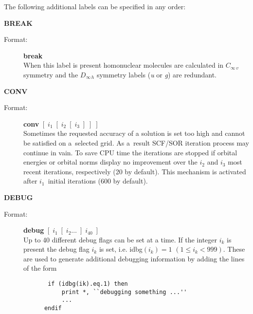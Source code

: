 \documentclass[12pt,a4paper]{article}
\newcommand{\ft}[1]{\texttt{#1}}
\begin{document}
The following additional labels can be specified in any order:
\begin{description}


\item \textbf{BREAK}
\begin{description}
\item[Format:] \textbf{break} \\ When this label is present homonuclear molecules are
  calculated in $C_{\infty\,v}$ symmetry and the $D_{\infty\,h}$ symmetry labels ({\it u}
  or {\it g}) are redundant.

\end{description}


\item \textbf{CONV}
\begin{description}
\item[Format:] \textbf{conv} $[\;i_1\;[\;i_2\;[\;i_3\;]\;]\;]$\\ Sometimes the requested
  accuracy of a solution is set too high and cannot be satisfied on a~selected grid. As
  a~result SCF/SOR iteration process may continue in vain. To save CPU time the iterations
  are stopped if orbital energies or orbital norms display no improvement over the $i_2$
  and $i_3$ most recent iterations, respectively (20 by default). This mechanism is
  activated after $i_1$~initial iterations (600 by default).
\end{description}

\item \textbf{DEBUG}
\begin{description}
\item[Format:] \textbf{debug} $[\; i_1 \; [\;i_2 \ldots \;] \;i_{40}\;]$ \\
  Up to 40 different debug flags can be set at a time.
  If the integer $i_k$ is present the debug flag $i_k$ is set, i.e. idbg$(i_k)=1$ $(1 \leq
  i_k<999)$. These are used to generate additional debugging information by adding the
  lines of the form
  \begin{verbatim}
       if (idbg(ik).eq.1) then
           print *, ``debugging something ...''
           ...
      endif
    \end{verbatim}
\end{description}



\end{description}
\end{document}
